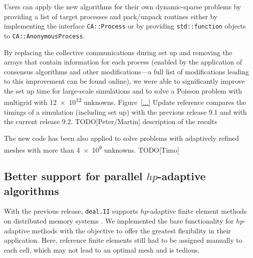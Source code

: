 \documentclass{ansarticle-preprint}
\newcommand{\specialword}[1]{\texttt{#1}}
\newcommand{\dealii}{{\specialword{deal.II}}\xspace}
\begin{document}
Users can apply the new algorithms for their own dynamic-sparse problems by
providing a list of target
processes and pack/unpack routines either by implementing the interface
\texttt{CA::\allowbreak Process} or by providing \texttt{std::function}
objects to \texttt{CA::AnonymousProcess}.


By replacing the collective communications during set up and removing the arrays
that contain information for each process (enabled by the application of consensus
algorithms and other modifications---a full list of modifications leading to this
improvement can be found online), we were able to significantly
improve the set up
time for large-scale simulations and to solve a Poisson problem with multigrid
with \num{12e12} unknowns.
Figure~\ref{...} {\color{red}Update reference} compares the timings of a simulation (including set up) with the
previous release 9.1 and with the current release 9.2.
{\color{red}TODO[Peter/Martin] description of the results}

The new code has been also applied to solve problems with adaptively refined
meshes with more than \num{4e9} unknowns. {\color{red}TODO[Timo]}



\subsection{Better support for parallel $hp$-adaptive algorithms}
\label{subsec:hp}

With the previous release, \dealii supports $hp$-adaptive finite element methods
on distributed memory systems \cite{dealII91}. We implemented the bare functionality
for $hp$-adaptive methods with the objective to offer the greatest flexibility in
their application. Here, reference finite elements still had to be assigned manually
to each cell, which may not lead to an optimal mesh and is tedious.
\end{document}
